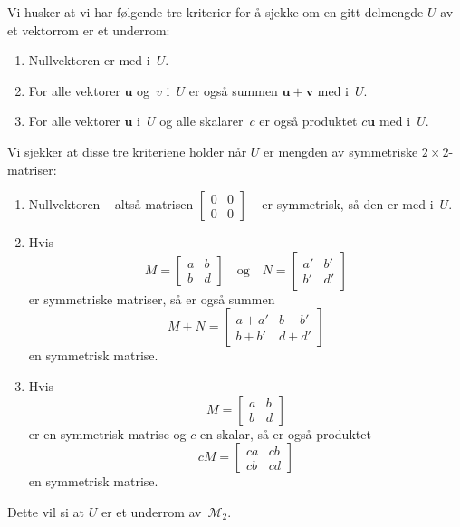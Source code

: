 \documentclass[notitlepage,a4paper,12pt,norsk]{IMFeksamen}
\newcommand{\M}{\mathcal{M}} %
\newcommand{\V}[1]{\mathbf{#1}}
\renewcommand{\u}{\V{u}}
\renewcommand{\v}{\V{v}}
\newcommand{\0}{\V{0}}
\newcommand{\oppgslutt}{
\begin{center}
\pgfornament[width=6cm]{88}
\end{center}
}
\newenvironment{losning}{\begin{oppgave}}{\oppgslutt\end{oppgave}}
\begin{document}
\begin{losning}
Vi husker at vi har følgende tre kriterier for å sjekke om en gitt
delmengde $U$ av et vektorrom er et underrom:
\begin{enumerate}
\item Nullvektoren er med i~$U$.
\item For alle vektorer $\u$ og~$v$ i~$U$
er også summen $\u + \v$ med i~$U$.
\item For alle vektorer $\u$ i~$U$ og alle skalarer~$c$
er også produktet $c\u$ med i~$U$.
\end{enumerate}
Vi sjekker at disse tre kriteriene holder når $U$ er mengden av
symmetriske $2 \times 2$-matriser:
\begin{enumerate}
\item Nullvektoren -- altså matrisen
$
\left[
\begin{smallmatrix}
0 & 0 \\
0 & 0
\end{smallmatrix}
\right]
$ --
er symmetrisk, så den er med i~$U$.
\item Hvis
\[
M =
\begin{bmatrix}
a & b \\
b & d
\end{bmatrix}
\quad\text{og}\quad
N =
\begin{bmatrix}
a' & b' \\
b' & d'
\end{bmatrix}
\]
er symmetriske matriser, så er også summen
\[
M + N =
\begin{bmatrix}
a+a' & b+b' \\
b+b' & d+d'
\end{bmatrix}
\]
en symmetrisk matrise.
\item Hvis
\[
M =
\begin{bmatrix}
a & b \\
b & d
\end{bmatrix}
\]
er en symmetrisk matrise og $c$ en skalar, så er også produktet
\[
cM =
\begin{bmatrix}
ca & cb \\
cb & cd
\end{bmatrix}
\]
en symmetrisk matrise.
\end{enumerate}
Dette vil si at $U$ er et underrom av~$\M_2$.


\end{losning}
\end{document}
